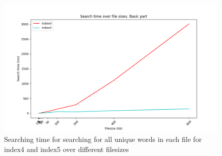 \begin{figure}[H]
    \centering
    \includegraphics[width=.8\textwidth]{LaTeX/Figures/BasicPart/BPSearch[4, 5].png}
    \caption{Searching time for searching for all unique words in each file for index4 and index5 over different filesizes}
    \label{fig:BPsearch45}
\end{figure} 




